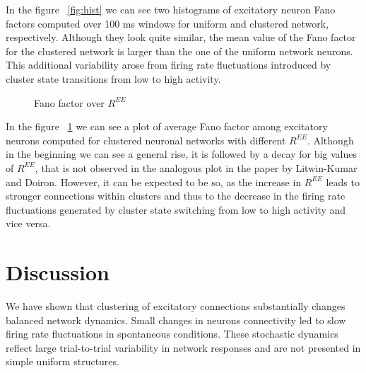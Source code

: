 \documentclass[11pt]{article}
\begin{document}
In the figure ~\ref{fig:hist} we can see two histograms of excitatory neuron Fano factors computed over 100 ms windows for uniform and clustered network, respectively. Although they look quite similar, the mean value of the Fano factor for the clustered network is larger than the one of the uniform network neurons. This additional variability arose from firing rate fluctuations introduced by cluster state transitions from low to high activity.


\begin{figure}[h]
\caption{Fano factor over $R^{EE}$}
\label{fig:ffoverree}
\end{figure}

In the figure ~\ref{fig:ffoverree} we can see a plot of average Fano factor among excitatory neurons computed for clustered neuronal networks with different $R^{EE}$. Although in the beginning we can see a general rise, it is followed by a decay for big values of $R^{EE}$, that is not observed in the analogous plot in the paper by Litwin-Kumar and Doiron. However, it can be expected to be so, as the increase in $R^{EE}$ leads to stronger connections within clusters and thus to the decrease in the firing rate fluctuations generated by cluster state switching from low to high activity and vice versa.



\section{Discussion}

We have shown that clustering of excitatory connections substantially changes balanced network dynamics. Small changes in neurons connectivity led to slow firing rate fluctuations in spontaneous conditions. These stochastic dynamics reflect large trial-to-trial variability in network responses and are not presented in simple uniform structures.
\end{document}
